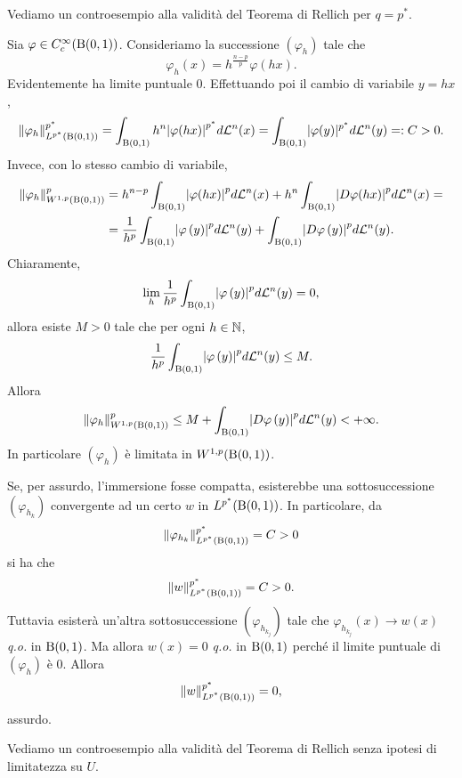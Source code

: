 Vediamo un controesempio alla validità del Teorema di Rellich per $q = p^\ast$.
\begin{esempio}
	Sia $\varphi \in C^\infty_c(\textup{B}(0,1))$. Consideriamo la successione $(\varphi_h)$ tale che
	\[ \varphi_h (x) = h^{\frac{n-p}{p}}\varphi(hx).  \]
	Evidentemente ha limite puntuale $0$. Effettuando poi il cambio di variabile $y = hx$,
	\[ \norm{\varphi_h}_{L^{p^\ast}(\textup{B}(0,1))}^{p^\ast} =\int_{\textup{B}(0,1)}h^n\abs*{\varphi(hx)}^{p^\ast} d\mathcal{L}^n(x) = \int_{\textup{B}(0,1)} \abs{\varphi(y)}^{p^\ast}d\mathcal{L}^n(y) =: C > 0. \]
	Invece, con lo stesso cambio di variabile,
	\begin{align*}
		\norm{\varphi_h}_{W^{1,p}(\textup{B}(0,1))}^{p} &= h^{n-p}\int_{\textup{B}(0,1)}\abs*{\varphi(hx)}^{p} d\mathcal{L}^n(x) + h^n\int_{\textup{B}(0,1)}\abs*{D\varphi(hx)}^{p} d\mathcal{L}^n(x) = \\
		&= \frac{1}{h^p} \int_{\textup{B}(0,1)}\abs*{\varphi\left(y \right)}^{p}d\mathcal{L}^n(y) + \int_{\textup{B}(0,1)}\abs*{D\varphi\left(y \right)}^{p}d\mathcal{L}^n(y). 
	\end{align*}
	Chiaramente, 
	\[ \lim\limits_{h} \frac{1}{h^p} \int_{\textup{B}(0,1)}\abs*{\varphi\left(y \right)}^{p}d\mathcal{L}^n(y) = 0,\]
	allora esiste $M > 0 $ tale che per ogni $h \in \mathbb{N}$,  
	\[ \frac{1}{h^p} \int_{\textup{B}(0,1)}\abs*{\varphi\left(y \right)}^{p}d\mathcal{L}^n(y) \le M. \]
	Allora 
	\[ \norm{\varphi_h}_{W^{1,p}(\textup{B}(0,1))}^{p} \le M + \int_{\textup{B}(0,1)}\abs*{D\varphi\left(y \right)}^{p}d\mathcal{L}^n(y) < +\infty. \]
	In particolare $(\varphi_h)$ è limitata in $W^{1,p}(\textup{B}(0,1))$. 
	
	Se, per assurdo, l'immersione fosse compatta, esisterebbe una sottosuccessione $(\varphi_{h_k})$ convergente ad un certo $w$ in $L^{p^\ast}(\textup{B}(0,1))$. 
	In particolare, da
	\[ \lVert\varphi_{h_k}\rVert_{L^{p^\ast}(\textup{B}(0,1))}^{p^\ast} = C > 0 \]
	si ha che 
	\[ \lVert w\rVert_{L^{p^\ast}(\textup{B}(0,1))}^{p^\ast} = C > 0. \]
	Tuttavia esisterà un'altra sottosuccessione $(\varphi_{h_{k_j}})$ tale che $\varphi_{h_{k_j}}(x) \to w(x)$ \emph{q.o.} in $\textup{B}(0,1)$. Ma allora $w(x) = 0$ \emph{q.o.} in $\textup{B}(0,1)$ perché il limite puntuale di $(\varphi_h)$ è $0$. Allora
	\[ \lVert w\rVert_{L^{p^\ast}(\textup{B}(0,1))}^{p^\ast} = 0, \]
	assurdo.
\end{esempio}
Vediamo un controesempio alla validità del Teorema di Rellich senza ipotesi di limitatezza su $U$.
